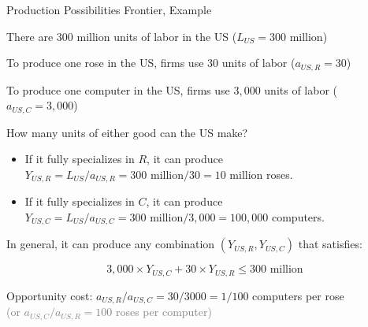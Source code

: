 \documentclass[notes,11pt, aspectratio=169, xcolor=table]{beamer}
\newenvironment{wideitemize}{\itemize\addtolength{\itemsep}{10pt}}{\enditemize}
\begin{document}
\begin{frame}{Production Possibilities Frontier, Example}
\begin{wideitemize}
        \item There are 300 million units of labor in the US ($L_{US} = 300$ million)
        \item To produce one rose in the US, firms use $30$ units of labor ($a_{US,R} = 30$)
        \item To produce one computer in the US, firms use $3,000$ units of labor ($a_{US,C} = 3,000$)
        \item How many units of either good can the US make?
        \begin{itemize}
            \item If it fully specializes in $R$, it can produce $Y_{US,R}=L_{US}/a_{US,R} = 300 \text{ million}/30 = 10 \text{ million}$ roses.
            \item If it fully specializes in $C$, it can produce $Y_{US,C}=L_{US}/a_{US,C} = 300 \text{ million}/3,000 = 100,000$ computers.
        \end{itemize}

        \item In general, it can produce any combination $(Y_{US,R}, Y_{US,C})$ that satisfies:

        \begin{equation*}
            3,000 \times Y_{US,C} + 30 \times Y_{US,R} \le 300 \text{ million}
        \end{equation*}
    \item Opportunity cost: $a_{US,R}/a_{US,C} = 30/3000 = 1/100$ computers per rose \\
    \qquad \textcolor{gray}{(or $a_{US,C}/a_{US,R} = 100$ roses per computer)}
    \end{wideitemize}
\end{frame}
\end{document}

